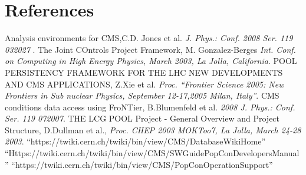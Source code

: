 \documentclass[a4paper]{jpconf}
\begin{document}
\section*{References}
\begin{thebibliography}{9}
 Analysis environments for CMS,C.D. Jones et al. {\em J. Phys.: Conf. 2008 Ser. 119 032027 }. 
 The Joint COntrols Project Framework, M. Gonzalez-Berges {\em Int. Conf. on Computing in High Energy Physics, March 2003, La Jolla, California}.
 POOL PERSISTENCY FRAMEWORK FOR THE LHC NEW DEVELOPMENTS AND CMS APPLICATIONS, Z.Xie et al. {\em {Proc. ``Frontier Science 2005: New Frontiers in Sub nuclear Physics, September 12-17,2005 Milan, Italy''}}.
 CMS conditions data access using FroNTier, B.Blumenfeld et al. {\em 2008 J. Phys.: Conf. Ser. 119 072007}.
 THE LCG POOL Project - General Overview and Project Structure, D.Dullman et al., { \em Proc. CHEP 2003 MOKToo7, La Jolla, March 24-28 2003}.
 ``https://twiki.cern.ch/twiki/bin/view/CMS/DatabaseWikiHome''
 ``Https://twiki.cern.ch/twiki/bin/view/CMS/SWGuidePopConDevelopersManual''
  ``https://twiki.cern.ch/twiki/bin/view/CMS/PopConOperationSupport''  
\end{thebibliography}
\end{document}
